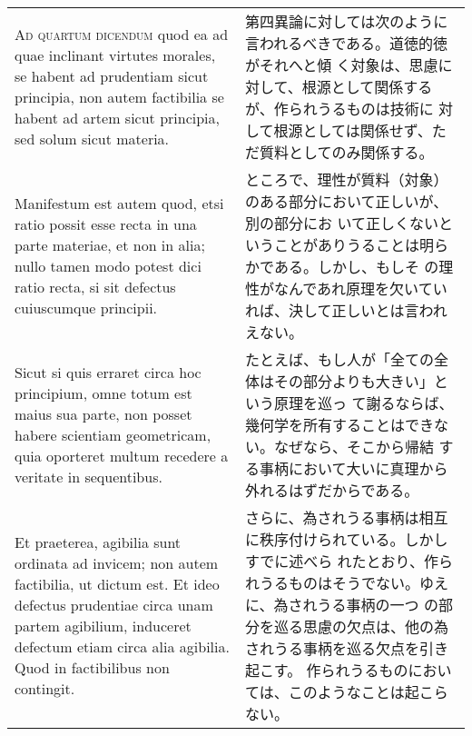 \documentclass[10pt]{jsarticle}
\begin{document}
\begin{longtable}{p{21em}p{21em}}
\\



{\scshape Ad quartum dicendum} quod ea ad quae inclinant virtutes
morales, se habent ad prudentiam sicut principia, non autem factibilia
se habent ad artem sicut principia, sed solum sicut
 materia.

 &

 第四異論に対しては次のように言われるべきである。道徳的徳がそれへと傾
 く対象は、思慮に対して、根源として関係するが、作られうるものは技術に
 対して根源としては関係せず、ただ質料としてのみ関係する。
 
 \\

 Manifestum est autem quod, etsi ratio possit esse recta in una parte
materiae, et non in alia; nullo tamen modo potest dici ratio recta, si
sit defectus cuiuscumque principii.


 &

 ところで、理性が質料（対象）のある部分において正しいが、別の部分にお
 いて正しくないということがありうることは明らかである。しかし、もしそ
 の理性がなんであれ原理を欠いていれば、決して正しいとは言われえない。
 
 \\


 Sicut si quis erraret circa hoc principium, omne totum est maius sua
parte, non posset habere scientiam geometricam, quia oporteret multum
recedere a veritate in sequentibus.

 &

 たとえば、もし人が「全ての全体はその部分よりも大きい」という原理を巡っ
 て謝るならば、幾何学を所有することはできない。なぜなら、そこから帰結
 する事柄において大いに真理から外れるはずだからである。
 
 \\

 Et praeterea, agibilia sunt ordinata ad invicem; non autem
factibilia, ut dictum est. Et ideo defectus prudentiae circa unam
partem agibilium, induceret defectum etiam circa alia agibilia. Quod
in factibilibus non contingit.
 
 &

 さらに、為されうる事柄は相互に秩序付けられている。しかしすでに述べら
 れたとおり、作られうるものはそうでない。ゆえに、為されうる事柄の一つ
 の部分を巡る思慮の欠点は、他の為されうる事柄を巡る欠点を引き起こす。
 作られうるものにおいては、このようなことは起こらない。
 
\end{longtable}
\newpage
\end{document}
